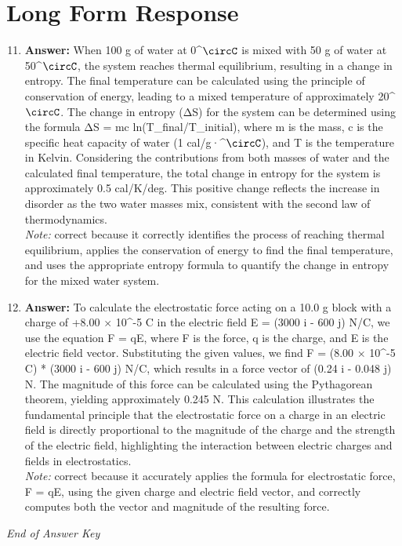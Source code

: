 \documentclass[12pt]{article}
\begin{document}
\section*{Long Form Response}
\begin{enumerate}[label=\arabic*.]
\setcounter{enumi}{10}
\item \textbf{Answer:} When 100 g of water at 0^\ensuremath{\circC} is mixed with 50 g of water at 50^\ensuremath{\circC}, the system reaches thermal equilibrium, resulting in a change in entropy. The final temperature can be calculated using the principle of conservation of energy, leading to a mixed temperature of approximately 20^\ensuremath{\circC}. The change in entropy (ΔS) for the system can be determined using the formula ΔS = mc ln(T\_final/T\_initial), where m is the mass, c is the specific heat capacity of water (1 cal/g·^\ensuremath{\circC}), and T is the temperature in Kelvin. Considering the contributions from both masses of water and the calculated final temperature, the total change in entropy for the system is approximately 0.5 cal/K/deg. This positive change reflects the increase in disorder as the two water masses mix, consistent with the second law of thermodynamics.
\\ \textit{Note:} correct because it correctly identifies the process of reaching thermal equilibrium, applies the conservation of energy to find the final temperature, and uses the appropriate entropy formula to quantify the change in entropy for the mixed water system.
\item \textbf{Answer:} To calculate the electrostatic force acting on a 10.0 g block with a charge of +8.00 \ensuremath{\times} 10^-5 C in the electric field E = (3000 i - 600 j) N/C, we use the equation F = qE, where F is the force, q is the charge, and E is the electric field vector. Substituting the given values, we find F = (8.00 \ensuremath{\times} 10^-5 C) * (3000 i - 600 j) N/C, which results in a force vector of (0.24 i - 0.048 j) N. The magnitude of this force can be calculated using the Pythagorean theorem, yielding approximately 0.245 N. This calculation illustrates the fundamental principle that the electrostatic force on a charge in an electric field is directly proportional to the magnitude of the charge and the strength of the electric field, highlighting the interaction between electric charges and fields in electrostatics.
\\ \textit{Note:} correct because it accurately applies the formula for electrostatic force, F = qE, using the given charge and electric field vector, and correctly computes both the vector and magnitude of the resulting force.
\end{enumerate}

\vfill
\noindent\textit{End of Answer Key}
\end{document}
